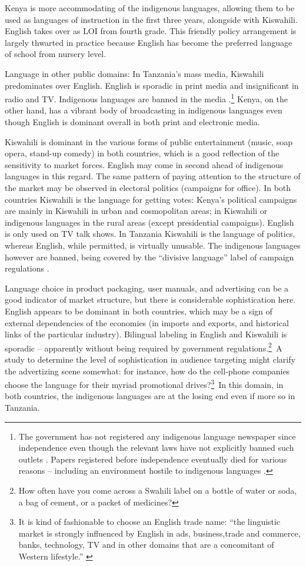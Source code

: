 \documentclass[output=paper,colorlinks,citecolor=brown]{langscibook}
\begin{document}
Kenya is more accommodating of the indigenous languages, allowing them to be used as languages of instruction in the first three years, alongside with Kiswahili. English takes over as LOI from fourth grade. This friendly policy arrangement is largely thwarted in practice because English has become the preferred language of school from nursery level. 

Language in other public domains: In Tanzania’s mass media, Kiswahili predominates over English. English is sporadic in print media and insignificant in radio and TV. Indigenous languages are banned in the media \citep{TCRA2005}.\footnote{The government has not registered any indigenous language newspaper since independence even though the relevant laws have not explicitly banned such outlets \citep[68--69]{Rugemalira2013}. Papers registered before independence eventually died for various reasons – including an environment hostile to indigenous languages \citep[92]{Madumulla2007}.} Kenya, on the other hand, has a vibrant body of broadcasting in indigenous languages even though English is dominant overall in both print and electronic media. 

Kiswahili is dominant in the various forms of public entertainment (music, soap opera, stand-up comedy) in both countries, which is a good reflection of the sensitivity to market forces. English may come in second ahead of indigenous languages in this regard. The same pattern of paying attention to the structure of the market may be observed in electoral politics (campaigns for office). In both countries Kiswahili is the language for getting votes: Kenya’s political campaigns are mainly in Kiswahili in urban and cosmopolitan areas; in Kiswahili or indigenous languages in the rural areas (except presidential campaigns). English is only used on TV talk shows. In Tanzania Kiswahili is the language of politics, whereas English, while permitted, is virtually unusable. The indigenous languages however are banned, being covered by the ``divisive language'' label of campaign regulations \citep{Tanzania-Government2010}.

Language choice in product packaging, user manuals, and advertising can be a good indicator of market structure, but there is considerable sophistication here. English appears to be dominant in both countries, which may be a sign of external dependencies of the economies (in imports and exports, and historical links of the particular industry). Bilingual labeling in English and Kiswahili is sporadic – apparently without being required by government regulations.\footnote{How often have you come across a Swahili label on a bottle of water or soda, a bag of cement, or a packet of medicines?}~A study to determine the level of sophistication in audience targeting might clarify the advertizing scene somewhat: for instance, how do the cell-phone companies choose the language for their myriad promotional drives?\footnote{It is kind of fashionable to choose an English trade name: “the linguistic market is strongly influenced by English in ads, business,trade and commerce, banks, technology, TV and in other domains that are a concomitant of Western lifestyle.” \citep[64]{Legere2010}}~In this domain, in both countries, the indigenous languages are at the losing end even if more so in Tanzania. 
\end{document}
